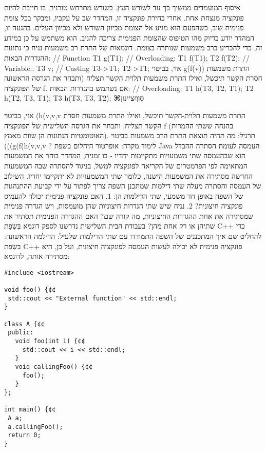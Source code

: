       איסוף המועמדים ממשיך כך עד לשורש העץ. בשורש מתרחש טורניר, בו חייבת להיות פונקציה מנצחת אחת. אחרי בחירת פונקציה זו, המהדר שב על עקביו, ומבקר בכל צומת פנימית שוב, כשהפעם הוא מגיע אל הצומת מכיוון השורש ולא מכיוון העלים. בהגעה זו, המהדר יודע בדיוק מהו הטיפוס שהצומת הפנימית צריכה להניב. הוא משתמש על כן במידע זה, כדי להכריע ברב משמעות שנותרה בצומת.
      דוגמאות של התרת רב משמעות
      נניח כי נתונות ההגדרות הבאות:
      // Function
      T1 g(T1);
      // Overloading:
      T1 f(T1);
      T2 f(T2);
      // Variable::
      T3 v;
      // Casting
      T3->T1;
      T2->T1;
      אזי, בביטוי
      g(f(v))
      התרת משמעות חסרת הקשר תיכשל, ואילו התרת משמעות תלוית הקשר תצליח (ותבחר את הגרסה הראשונה של הפונקציה f.
      אם נשתמש בהגדרות הבאות:
      // Overloading:
      T1 h(T3, T2, T1);
      T2 h(T2, T3, T1);
      T3 h(T3, T3, T2);
  ⌘סוף{ציינון}

      אזי, בביטוי (h(v,v,v התרת משמעות תלוית-הקשר תיכשל, ואילו התרת משמעות חסרת הקשר תצליח, ותבחר את הגרסה השלישית של הפונקציה f (בהנחה ששתי ההמרות האוטומטיות הנתונות הן שוות מאמץ).
      תרגיל: מה תהיה תוצאת התרת הרב משמעות בביטוי (((g(f(h(v,v,v ?
      לימוד מקרה: אופרטור היהלום בשפת Java
      העמסה לעומת הסתרה
      ההבדל הוא שבהעמסה שתי משמעויות מתקיימות יחדיו - בו זמנית, המהדר בוחר את המשמעות המתאימה לפי הפרמטרים של הקריאה לפונקציה למשל, בניגוד להסתרה שבה המשמעות החדשה מסתירה את המשמעות הישנה, כלומר שתי המשמעויות לא יתקיימו יחדיו.
      השילוב של העמסה והסתרה מעלה שתי דילמות שמתכנן השפה צריך לפתור על ידי קביעת ההתנהגות של השפה באופן חד משמעי, שתי הדילמות הן:
      1. האם פונקציה פנימית יכולה להעמיס פונקציה חיצונית?
      2. נניח שיש שתי הגדרות חיצוניות שהן מועמסות, ויש הגדרה פנימית שמסתירה את אחת ההגדרות החיצוניות, מה קורה שם? האם ההגדרה הפנימית תסתיר את שתיהן או רק אחת מהן?
      בעבודת הבית השלישית נדרשנו לספק דוגמא בִּשְׂפַת C++ כדי להחליט שם איך המתכננים של השפה התמודדו עם שתי הדילמות שלעיל:
      הדילמה הראשונה: בִּשְׂפַת C++ פונקציה פנימית לא יכולה לעשות העמסה לפונקציה חיצונית, ועל כן, היא מסתירה אותה, לדוגמא:

\begin{verbatim}
#include <iostream>

void foo() {¢¢
 std::cout << "External function" << std::endl;
}

class A {¢¢
 public:
   void foo(int i) {¢¢
     std::cout << i << std::endl;
   }
   void callingFoo() {¢¢
     foo();
   }
};

int main() {¢¢
 A a;
 a.callingFoo();
 return 0;
}
\end{verbatim}

